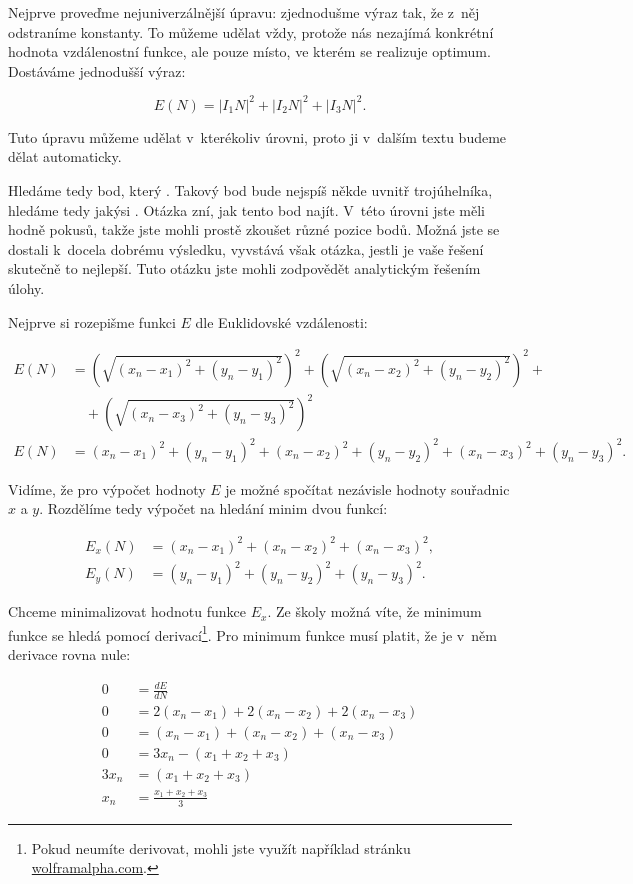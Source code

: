 \documentclass[12pt,a4paper]{article}
\begin{document}
Nejprve proveďme nejuniverzálnější úpravu: zjednodušme výraz tak, že z~něj
odstraníme konstanty. To můžeme udělat vždy, protože nás nezajímá konkrétní
hodnota vzdálenostní funkce, ale pouze místo, ve kterém se realizuje optimum.
Dostáváme jednodušší výraz:

$$E(N) = |I_1N|^2 + |I_2N|^2 + |I_3N|^2.$$

Tuto úpravu můžeme udělat v~kterékoliv úrovni, proto ji v~dalším textu budeme
dělat automaticky.

Hledáme tedy bod, který . Takový bod bude
nejspíš někde uvnitř trojúhelníka, hledáme tedy jakýsi . Otázka zní,
jak tento bod najít. V~této úrovni jste měli hodně pokusů, takže jste mohli
prostě zkoušet různé pozice bodů. Možná jste se dostali k~docela dobrému
výsledku, vyvstává však otázka, jestli je vaše řešení skutečně to nejlepší.
Tuto otázku jste mohli zodpovědět analytickým řešením úlohy.

Nejprve si rozepišme funkci $E$ dle Euklidovské vzdálenosti:

\begin{align}
E(N) &= \left(\sqrt{(x_n-x_1)^2 + (y_n - y_1)^2}\right)^2 +
	\left(\sqrt{(x_n-x_2)^2 + (y_n - y_2)^2}\right)^2 + \nonumber \\
	&\hspace{1em} + \left(\sqrt{(x_n-x_3)^2 + (y_n - y_3)^2}\right)^2 \nonumber \\
E(N) &= (x_n-x_1)^2 + (y_n - y_1)^2 +
	(x_n-x_2)^2 + (y_n - y_2)^2 +
	(x_n-x_3)^2 + (y_n - y_3)^2 \nonumber.
\end{align}

Vidíme, že pro výpočet hodnoty $E$ je možné spočítat nezávisle hodnoty souřadnic
$x$ a $y$. Rozdělíme tedy výpočet na hledání minim dvou funkcí:

\begin{align}
E_x(N) &= (x_n-x_1)^2 + (x_n-x_2)^2 + (x_n-x_3)^2 \nonumber, \\
E_y(N) &= (y_n-y_1)^2 + (y_n-y_2)^2 + (y_n-y_3)^2 \nonumber.
\end{align}

Chceme minimalizovat hodnotu funkce $E_x$. Ze školy možná víte, že minimum
funkce se hledá pomocí derivací\footnote{Pokud neumíte derivovat, mohli jste
využít například stránku \url{wolframalpha.com}.}. Pro minimum funkce musí
platit, že je v~něm derivace rovna nule:

\begin{align}
0 &= \frac{dE}{dN} \nonumber \\
0 &= 2(x_n-x_1) + 2(x_n-x_2) + 2(x_n-x_3) \nonumber \\
0 &= (x_n-x_1) + (x_n-x_2) + (x_n-x_3) \nonumber \\
0 &= 3x_n - (x_1 + x_2 + x_3) \nonumber \\
3x_n &= (x_1 + x_2 + x_3) \nonumber \\
x_n &= \frac{x_1 + x_2 + x_3}{3} \nonumber
\end{align}
\end{document}
